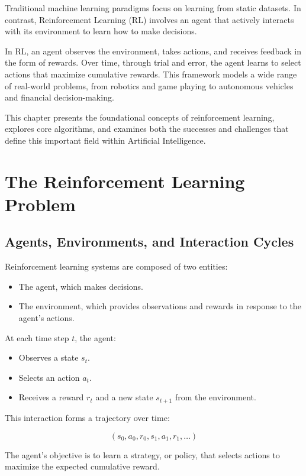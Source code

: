 \documentclass[openany]{book}
\begin{document}
Traditional machine learning paradigms focus on learning from static datasets. 
In contrast, Reinforcement Learning (RL) involves an agent that actively 
interacts with its environment to learn how to make decisions.

In RL, an agent observes the environment, takes actions, and receives feedback 
in the form of rewards. Over time, through trial and error, the agent learns to 
select actions that maximize cumulative rewards. This framework models a wide 
range of real-world problems, from robotics and game playing to autonomous 
vehicles and financial decision-making.

This chapter presents the foundational concepts of reinforcement learning, 
explores core algorithms, and examines both the successes and challenges that 
define this important field within Artificial Intelligence.

\section{The Reinforcement Learning Problem}

\subsection{Agents, Environments, and Interaction Cycles}

Reinforcement learning systems are composed of two entities:

\begin{itemize}
    \item The agent, which makes decisions.
    \item The environment, which provides observations and rewards in response 
    to the agent's actions.
\end{itemize}

At each time step \( t \), the agent:

\begin{itemize}
    \item Observes a state \( s_t \).
    \item Selects an action \( a_t \).
    \item Receives a reward \( r_t \) and a new state \( s_{t+1} \) from the
     environment.
\end{itemize}

This interaction forms a trajectory over time:

\[
(s_0, a_0, r_0, s_1, a_1, r_1, \dots)
\]

The agent's objective is to learn a strategy, or policy, that selects actions 
to maximize the expected cumulative reward.
\end{document}
